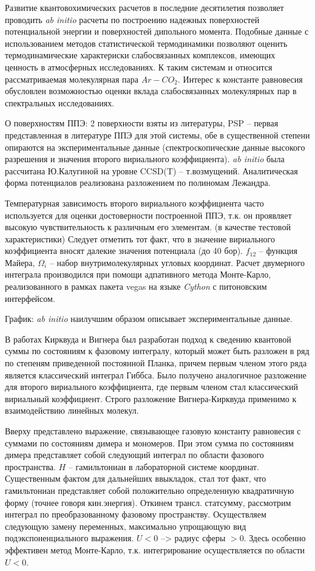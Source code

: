 \documentclass[12pt]{article}
\begin{document}
Развитие квантовохимических расчетов в последние десятилетия позволяет проводить \textit{ab initio} расчеты по построению надежных поверхностей потенциальной энергии и поверхностей дипольного момента. Подобные данные с использованием методов статистической термодинамики позволяют оценить термодинамические характериски слабосвязанных комплексов, имеющих ценность в атмосферных исследованиях. К таким системам и относится рассматриваемая молекулярная пара $Ar-CO_2$. Интерес к константе равновесия обусловлен возможностью оценки вклада слабосвязанных молекулярных пар в спектральных исследованиях. \par
О поверхностям ППЭ: 2 поверхности взяты из литературы, PSP -- первая представленная в литературе ППЭ для этой системы, обе в существенной степени опираются на экспериментальные данные (спектроскопические данные высокого разрешения и значения второго вириального коэффициента). \textit{ab initio} была рассчитана Ю.Калугиной на уровне CCSD(T) -- т.возмущений. Аналитическая форма потенциалов реализована разложением по полиномам Лежандра. \par 
Температурная зависимость второго вириального коэффициента часто используется для оценки достоверности построенной ППЭ, т.к. он проявляет высокую чувствительность к различным его элементам. (в качестве тестовой характеристики) Следует отметить тот факт, что в значение вириального коэффициента вносят далекие значения потенциала (до 40 бор). $f_{12}$ -- функция Майера, $\Omega_i$ -- набор внутримолекулярных угловых координат.  Расчет двумерного интеграла производился при помощи адпативного метода Монте-Карло, реализованного в рамках пакета vegas на языке \textit{Cython} с питоновским интерфейсом. \par
График: \textit{ab initio} наилучшим образом описывает экспериментальные данные. \par
В работах Кирквуда и Вигнера был разработан подход к сведению квантовой суммы по состояниям к фазовому интегралу, который может быть разложен в ряд по степеням приведенной постоянной Планка, причем первым членом этого ряда является классический интеграл Гиббса. Было получено аналогичное разложение для второго вириального коэффициента, где первым членом стал классический вириальный коэффициент. Строго разложение Вигнера-Кирквуда применимо к взаимодействию линейных молекул. \par
Вверху представлено выражение, связывающее газовую константу равновесия с суммами по состояниям димера и мономеров. При этом сумма по состояниям димера представляет собой следующий интеграл по области фазового пространства. $H$ -- гамильтониан в лабораторной системе координат. Существенным фактом для дальнейших ввыкладок, стал тот факт, что гамильтониан представляет собой положительно определенную квадратичную форму (точнее говоря кин.энергия). Откинем трансл. статсумму, рассмотрим интеграл по преобразованному фазовому пространству. Осуществляем следующую замену переменных, максимально упрощающую вид подэкспоненциального выражения. $U < 0$ --> радиус сферы $>0$. Здесь особенно эффективен метод Монте-Карло, т.к. интегрирование осуществляется по области $U<0$.  \par
\end{document}
